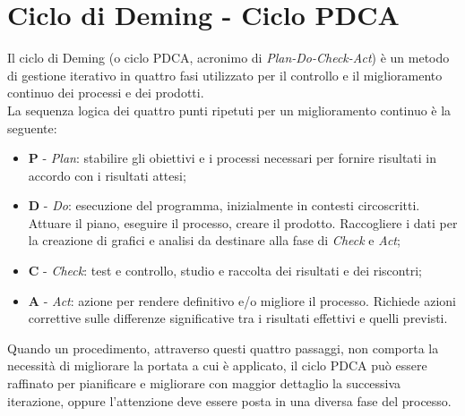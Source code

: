 \section{Ciclo di Deming - Ciclo PDCA}
Il ciclo di Deming (o ciclo PDCA, acronimo di \textit{Plan-Do-Check-Act}) è un metodo di gestione iterativo in quattro fasi utilizzato per il controllo e il miglioramento continuo dei processi e dei prodotti.\\
La sequenza logica dei quattro punti ripetuti per un miglioramento continuo è la seguente:
\begin{itemize}
\item \textbf{P} - \textit{Plan}: stabilire gli obiettivi e i processi necessari per fornire risultati in accordo con i risultati attesi;
\item \textbf{D} - \textit{Do}: esecuzione del programma, inizialmente in contesti circoscritti. Attuare il piano, eseguire il processo, creare il prodotto. Raccogliere i dati per la creazione di grafici e analisi da destinare alla fase di \textit{Check} e \textit{Act};
\item \textbf{C} - \textit{Check}: test e controllo, studio e raccolta dei risultati e dei riscontri;
\item \textbf{A} - \textit{Act}: azione per rendere definitivo e/o migliore il processo. Richiede azioni correttive sulle differenze significative tra i risultati effettivi e quelli previsti. 
\end{itemize}
Quando un procedimento, attraverso questi quattro passaggi, non comporta la necessità di migliorare la portata a cui è applicato, il ciclo PDCA può essere raffinato per pianificare e migliorare con maggior dettaglio la successiva iterazione, oppure l'attenzione deve essere posta in una diversa fase del processo.